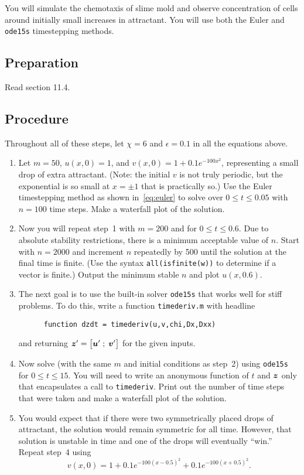 \documentclass[11pt,twoside]{article}
\begin{document}
You will simulate the chemotaxis of slime mold and observe concentration of cells around initially small increases in attractant. You will use both the Euler and \texttt{ode15s} timestepping methods.

\subsection*{Preparation}

Read section 11.4. 

\subsection*{Procedure}

Throughout all of these steps, let  $\chi=6$ and $\epsilon=0.1$ in all the equations above. 

\begin{enumerate}
\item Let $m=50$, $u(x,0)=1$, and $v(x,0)=1+0.1e^{-100x^2}$, representing a small drop of extra attractant. (Note: the initial $v$ is not truly periodic, but the exponential is so small at $x=\pm1$ that is practically so.) Use the Euler timestepping method as shown in~\eqref{eq:euler} to solve over $0\le t \le0.05$ with $n=100$ time steps. Make a waterfall plot of the solution.
  
\item Now you will repeat step~1 with $m=200$ and for $0\le t \le 0.6$. Due to absolute stability restrictions, there is a minimum acceptable value of $n$. Start with $n=2000$ and increment $n$ repeatedly by 500 until the solution at the final time is finite. (Use the syntax \texttt{all(isfinite(w))} to determine if a vector is finite.) Output the minimum stable $n$ and plot $u(x,0.6)$. 
  
\item The next goal is to use the built-in solver \texttt{ode15s} that works well for stiff problems. To do this, write a function \texttt{timederiv.m} with headline
    \begin{verbatim}
      function dzdt = timederiv(u,v,chi,Dx,Dxx)
    \end{verbatim}	
  and returning $\bm{z}'=\bigl[ \bm{u}'\;;\; \bm{v}' \bigr]$ for the given inputs.
  
\item Now solve (with the same $m$ and initial conditions as step~2) using \texttt{ode15s} for $0\le t \le 15$. You will need to write an anonymous function of $t$ and $\bm{z}$ only that encapsulates a call to \texttt{timederiv}. Print out the number of time steps that were taken and make a waterfall plot of the solution.
  
\item You would expect that if there were two symmetrically placed drops of attractant, the solution would remain symmetric for all time. However, that solution is unstable in time and one of the drops will eventually ``win.'' Repeat step~4 using $$v(x,0)=1+0.1e^{-100(x-0.5)^2}+0.1e^{-100(x+0.5)^2}.$$
  
\end{enumerate}
\end{document}
